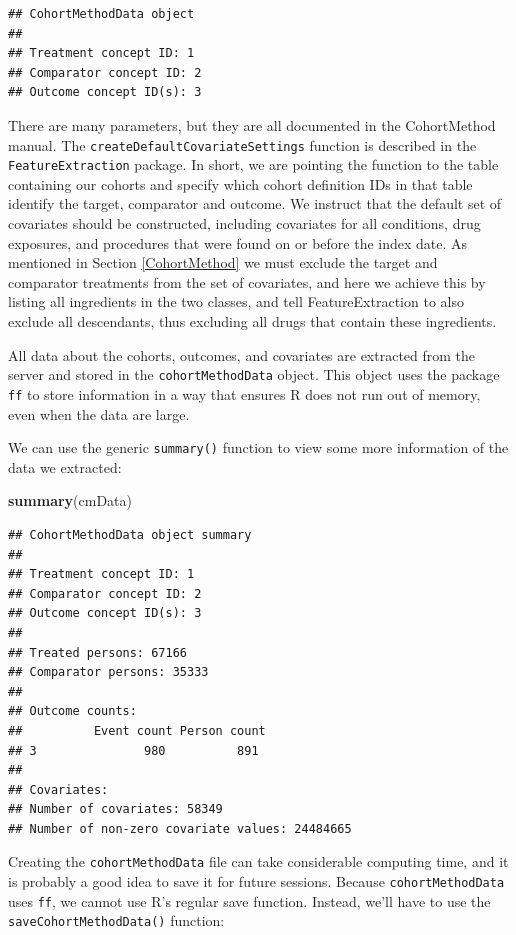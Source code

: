 \documentclass[11pt]{book}
\newenvironment{Shaded}{\begin{snugshade}}{\end{snugshade}}
\newcommand{\KeywordTok}[1]{\textcolor[rgb]{0.13,0.29,0.53}{\textbf{#1}}}
\newcommand{\NormalTok}[1]{#1}
\begin{document}
\begin{verbatim}
## CohortMethodData object
## 
## Treatment concept ID: 1
## Comparator concept ID: 2
## Outcome concept ID(s): 3
\end{verbatim}

There are many parameters, but they are all documented in the
CohortMethod manual. The \texttt{createDefaultCovariateSettings}
function is described in the \texttt{FeatureExtraction} package. In
short, we are pointing the function to the table containing our cohorts
and specify which cohort definition IDs in that table identify the
target, comparator and outcome. We instruct that the default set of
covariates should be constructed, including covariates for all
conditions, drug exposures, and procedures that were found on or before
the index date. As mentioned in Section \ref{CohortMethod} we must
exclude the target and comparator treatments from the set of covariates,
and here we achieve this by listing all ingredients in the two classes,
and tell FeatureExtraction to also exclude all descendants, thus
excluding all drugs that contain these ingredients.

All data about the cohorts, outcomes, and covariates are extracted from
the server and stored in the \texttt{cohortMethodData} object. This
object uses the package \texttt{ff} to store information in a way that
ensures R does not run out of memory, even when the data are large.

We can use the generic \texttt{summary()} function to view some more
information of the data we extracted:

\begin{Shaded}
\begin{Highlighting}[]
\KeywordTok{summary}\NormalTok{(cmData)}
\end{Highlighting}
\end{Shaded}

\begin{verbatim}
## CohortMethodData object summary
## 
## Treatment concept ID: 1
## Comparator concept ID: 2
## Outcome concept ID(s): 3
## 
## Treated persons: 67166
## Comparator persons: 35333
## 
## Outcome counts:
##          Event count Person count
## 3               980          891
## 
## Covariates:
## Number of covariates: 58349
## Number of non-zero covariate values: 24484665
\end{verbatim}

Creating the \texttt{cohortMethodData} file can take considerable
computing time, and it is probably a good idea to save it for future
sessions. Because \texttt{cohortMethodData} uses \texttt{ff}, we cannot
use R's regular save function. Instead, we'll have to use the
\texttt{saveCohortMethodData()} function:
\end{document}
